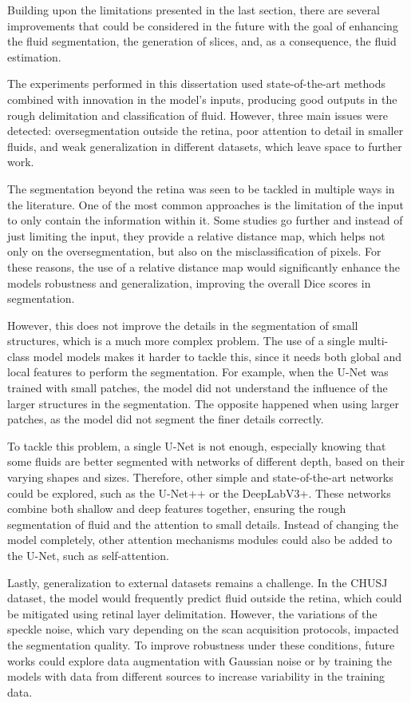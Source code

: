 Building upon the limitations presented in the last section, there are several improvements that could be considered in the future with the goal of enhancing the fluid segmentation, the generation of slices, and, as a consequence, the fluid estimation.
\par
The experiments performed in this dissertation used state-of-the-art methods combined with innovation in the model's inputs, producing good outputs in the rough delimitation and classification of fluid. However, three main issues were detected: oversegmentation outside the retina, poor attention to detail in smaller fluids, and weak generalization in different datasets, which leave space to further work.
\par
The segmentation beyond the retina was seen to be tackled in multiple ways in the literature. One of the most common approaches is the limitation of the input to only contain the information within it. Some studies go further and instead of just limiting the input, they provide a relative distance map, which helps not only on the oversegmentation, but also on the misclassification of pixels. For these reasons, the use of a relative distance map would significantly enhance the models robustness and generalization, improving the overall Dice scores in segmentation.
\par
However, this does not improve the details in the segmentation of small structures, which is a much more complex problem. The use of a single multi-class model models makes it harder to tackle this, since it needs both global and local features to perform the segmentation. For example, when the U-Net was trained with small patches, the model did not understand the influence of the larger structures in the segmentation. The opposite happened when using larger patches, as the model did not segment the finer details correctly.
\par
To tackle this problem, a single U-Net is not enough, especially knowing that some fluids are better segmented with networks of different depth, based on their varying shapes and sizes. Therefore, other simple and state-of-the-art networks could be explored, such as the U-Net++ or the DeepLabV3+. These networks combine both shallow and deep features together, ensuring the rough segmentation of fluid and the attention to small details. Instead of changing the model completely, other attention mechanisms modules could also be added to the U-Net, such as self-attention.
\par
Lastly, generalization to external datasets remains a challenge. In the CHUSJ dataset, the model would frequently predict fluid outside the retina, which could be mitigated using retinal layer delimitation. However, the variations of the speckle noise, which vary depending on the scan acquisition protocols, impacted the segmentation quality. To improve robustness under these conditions, future works could explore data augmentation with Gaussian noise or by training the models with data from different sources to increase variability in the training data.
